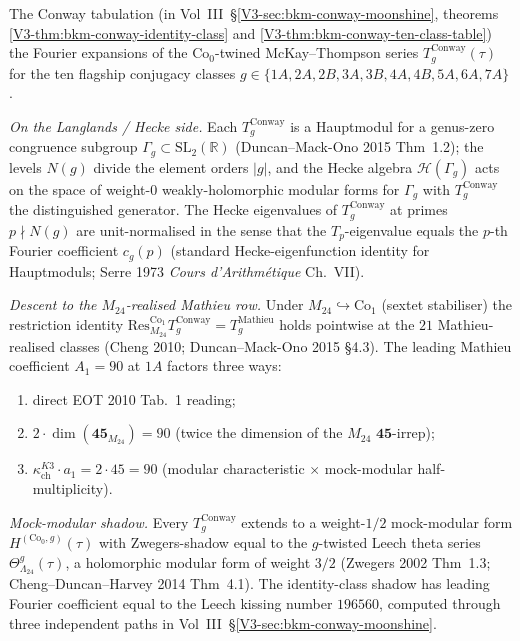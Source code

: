 \begin{remark}
\label{rem:dl-conway-hecke}
%
%
The Conway tabulation (in
Vol~III~\S\ref{V3-sec:bkm-conway-moonshine}, theorems
\ref{V3-thm:bkm-conway-identity-class} and
\ref{V3-thm:bkm-conway-ten-class-table}) the Fourier expansions of
the $\mathrm{Co}_0$-twined McKay--Thompson series
$T_g^{\mathrm{Conway}}(\tau)$ for the ten flagship conjugacy classes
$g \in \{1A, 2A, 2B, 3A, 3B, 4A, 4B, 5A, 6A, 7A\}$.

\emph{On the Langlands / Hecke side.} Each
$T_g^{\mathrm{Conway}}$ is a Hauptmodul for a genus-zero congruence
subgroup $\Gamma_g \subset \mathrm{SL}_2(\mathbb{R})$ (Duncan--Mack-Ono
2015 Thm~1.2); the levels $N(g)$ divide the element orders $|g|$, and
the Hecke algebra $\mathcal{H}(\Gamma_g)$ acts on the space of weight-$0$
weakly-holomorphic modular forms for $\Gamma_g$ with $T_g^{\mathrm{Conway}}$
the distinguished generator. The Hecke eigenvalues of
$T_g^{\mathrm{Conway}}$ at primes $p \nmid N(g)$ are unit-normalised
in the sense that the $T_p$-eigenvalue equals the $p$-th Fourier
coefficient $c_g(p)$ (standard Hecke-eigenfunction identity for
Hauptmoduls; Serre 1973 \emph{Cours d'Arithm\'etique} Ch.~VII).

\emph{Descent to the $M_{24}$-realised Mathieu row.} Under
$M_{24}\hookrightarrow\mathrm{Co}_1$ (sextet stabiliser) the restriction
identity
$\mathrm{Res}^{\mathrm{Co}_1}_{M_{24}} T_g^{\mathrm{Conway}}
= T_g^{\mathrm{Mathieu}}$ holds pointwise at the $21$ Mathieu-realised
classes (Cheng 2010; Duncan--Mack-Ono 2015 \S 4.3). The leading Mathieu
coefficient $A_1 = 90$ at $1A$ factors three ways:
\begin{enumerate}[label=\textup{(\roman*)}]
\item direct EOT 2010 Tab.~1 reading;
\item $2\cdot\dim(\mathbf{45}_{M_{24}}) = 90$ (twice the dimension
of the $M_{24}$ $\mathbf{45}$-irrep);
\item $\kappa_{\mathrm{ch}}^{K3}\cdot a_1 = 2 \cdot 45 = 90$ (modular
characteristic $\times$ mock-modular half-multiplicity).
\end{enumerate}

\emph{Mock-modular shadow.} Every
$T_g^{\mathrm{Conway}}$ extends to a weight-$1/2$ mock-modular form
$H^{(\mathrm{Co}_0, g)}(\tau)$ with Zwegers-shadow equal to the
$g$-twisted Leech theta series
$\Theta^g_{\Lambda_{24}}(\tau)$, a holomorphic modular form of weight
$3/2$ (Zwegers 2002 Thm~1.3; Cheng--Duncan--Harvey 2014 Thm~4.1). The
identity-class shadow has leading Fourier coefficient equal to the
Leech kissing number $196560$, computed through three independent paths
in Vol~III~\S\ref{V3-sec:bkm-conway-moonshine}.


\end{remark}
